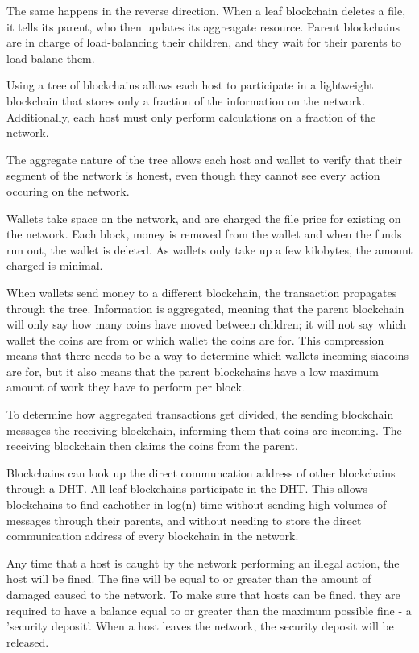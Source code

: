 \documentclass[twocolumn]{article}
\begin{document}
The same happens in the reverse direction.
When a leaf blockchain deletes a file, it tells its parent, who then updates its aggreagate resource.
Parent blockchains are in charge of load-balancing their children, and they wait for their parents to load balane them.

Using a tree of blockchains allows each host to participate in a lightweight blockchain that stores only a fraction of the information on the network.
Additionally, each host must only perform calculations on a fraction of the network.

The aggregate nature of the tree allows each host and wallet to verify that their segment of the network is honest, even though they cannot see every action occuring on the network.

Wallets take space on the network, and are charged the file price for existing on the network.
Each block, money is removed from the wallet and when the funds run out, the wallet is deleted.
As wallets only take up a few kilobytes, the amount charged is minimal.

When wallets send money to a different blockchain, the transaction propagates through the tree.
Information is aggregated, meaning that the parent blockchain will only say how many coins have moved between children; it will not say which wallet the coins are from or which wallet the coins are for.
This compression means that there needs to be a way to determine which wallets incoming siacoins are for, but it also means that the parent blockchains have a low maximum amount of work they have to perform per block.

To determine how aggregated transactions get divided, the sending blockchain messages the receiving blockchain, informing them that coins are incoming.
The receiving blockchain then claims the coins from the parent.

Blockchains can look up the direct communcation address of other blockchains through a DHT.
All leaf blockchains participate in the DHT.
This allows blockchains to find eachother in log(n) time without sending high volumes of messages through their parents, and without needing to store the direct communication address of every blockchain in the network.

Any time that a host is caught by the network performing an illegal action, the host will be fined.
The fine will be equal to or greater than the amount of damaged caused to the network.
To make sure that hosts can be fined, they are required to have a balance equal to or greater than the maximum possible fine - a 'security deposit'.
When a host leaves the network, the security deposit will be released.
\end{document}
